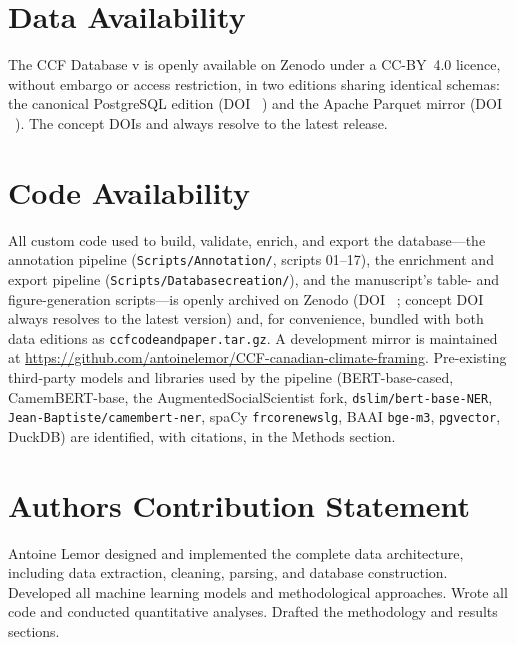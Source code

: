 \documentclass[12pt]{article}
\renewcommand\_{\texttt{\detokenize{_}\allowbreak}}
\begin{document}
\section{Data Availability}
\label{sec:data_availability}

The CCF Database v\CCFversion{} is openly available on Zenodo under a CC-BY~4.0 licence, without embargo or access restriction, in two editions sharing identical schemas: the canonical PostgreSQL edition (DOI \CCFsqldoi{}~\autocite{lemor_ccf_database_2026}) and the Apache Parquet mirror (DOI \CCFparquetdoi{}~\autocite{lemor_ccf_database_parquet_2026}). The concept DOIs \CCFsqldoiConcept{} and \CCFparquetdoiConcept{} always resolve to the latest release.

\section{Code Availability}
\label{sec:code_availability}

All custom code used to build, validate, enrich, and export the database---the annotation pipeline (\texttt{Scripts/Annotation/}, scripts 01--17), the enrichment and export pipeline (\texttt{Scripts/Database\_creation/}), and the manuscript's table- and figure-generation scripts---is openly archived on Zenodo (DOI \CCFcodedoi{}~\autocite{lemor_ccf_code_2026}; concept DOI \CCFcodedoiConcept{} always resolves to the latest version) and, for convenience, bundled with both data editions as \texttt{ccf\_code\_and\_paper.tar.gz}. A development mirror is maintained at \url{https://github.com/antoinelemor/CCF-canadian-climate-framing}. Pre-existing third-party models and libraries used by the pipeline (BERT-base-cased, CamemBERT-base, the AugmentedSocialScientist fork, \texttt{dslim/bert-base-NER}, \texttt{Jean-Baptiste/camembert-ner}, spaCy \texttt{fr\_core\_news\_lg}, BAAI \texttt{bge-m3}, \texttt{pgvector}, DuckDB) are identified, with citations, in the Methods section.

\section{Authors Contribution Statement}

Antoine Lemor designed and implemented the complete data architecture, including data extraction, cleaning, parsing, and database construction. Developed all machine learning models and methodological approaches. Wrote all code and conducted quantitative analyses. Drafted the methodology and results sections.
\end{document}
